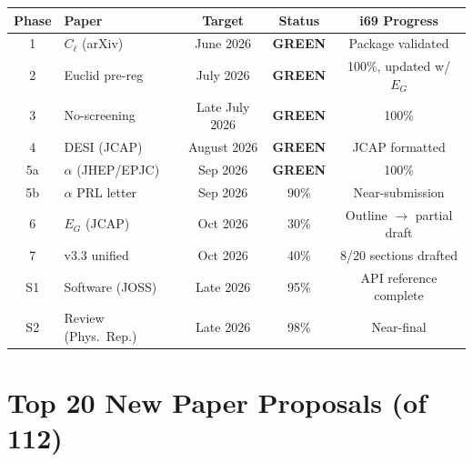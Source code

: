 \documentclass[11pt,a4paper]{article}
\newcommand{\GREEN}{\textcolor{dfdgreen}{\textbf{GREEN}}}
\begin{document}
\begin{center}
\begin{tabular}{clccc}
\toprule
\textbf{Phase} & \textbf{Paper} & \textbf{Target} & \textbf{Status} & \textbf{i69 Progress} \\
\midrule
1 & $C_\ell$ (arXiv) & June 2026 & \GREEN & Package validated \\
2 & Euclid pre-reg & July 2026 & \GREEN & 100\%, updated w/ $E_G$ \\
3 & No-screening & Late July 2026 & \GREEN & 100\% \\
4 & DESI (JCAP) & August 2026 & \GREEN & JCAP formatted \\
5a & $\alpha$ (JHEP/EPJC) & Sep 2026 & \GREEN & 100\% \\
5b & $\alpha$ PRL letter & Sep 2026 & 90\% & Near-submission \\
6 & $E_G$ (JCAP) & Oct 2026 & 30\% & Outline $\to$ partial draft \\
7 & v3.3 unified & Oct 2026 & 40\% & 8/20 sections drafted \\
\midrule
S1 & Software (JOSS) & Late 2026 & 95\% & API reference complete \\
S2 & Review (Phys.\ Rep.) & Late 2026 & 98\% & Near-final \\
\bottomrule
\end{tabular}
\end{center}


\section{Top 20 New Paper Proposals (of 112)}
\end{document}
